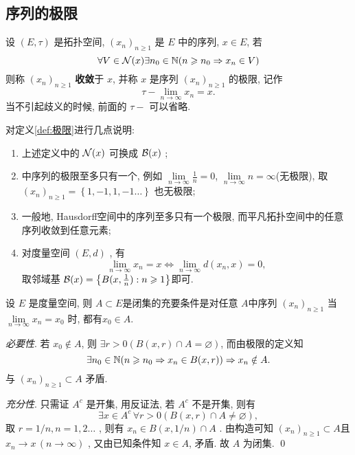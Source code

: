      \subsection{序列的极限}
     \begin{Definition}[极限]\label{def:极限}
          设 $ (E, \tau) $ 是拓扑空间, $ (x_{n})_{n\geqslant 1} $ 是 $ E $ 中的序列,  $ x\in E $, 若
          \[
               \forall V\in\mathcal{N}(x)\exists n_{0}\in\mathbb{N}(n\geqslant n_{0}\Rightarrow x_{n}\in V)
          \]
          则称 $ (x_{n})_{n\geqslant1} $ \textbf{收敛}于 $ x $, 并称 $ x $ 是序列 $ (x_{n})_{n\geqslant1} $ 的极限, 记作
          \[
               \tau-\lim_{n\to \infty}x_{n}=x. 
          \] 
          当不引起歧义的时候, 前面的 $ \tau- $ 可以省略. 
     \end{Definition}
     \begin{Remark}
          对定义\ref{def:极限}进行几点说明:
          \begin{enumerate}[(1)]
               \item 上述定义中的 $ \mathcal{N}(x) $ 可换成 $ \mathcal{B}(x) $ ;
               \item \R 中序列的极限至多只有一个, 例如 $\lim\limits_{n\to\infty}\frac{1}{n}=0 $, $ \lim\limits_{n\to\infty} n=\infty$(无极限), 取 $ (x_{n})_{n\geqslant1}=\left\{ 1, -1, 1,  -1\ldots \right\} $ 也无极限;
               \item\label{item:Hausdorff空间上极限唯一性} 一般地, Hausdorff空间中的序列至多只有一个极限, 而平凡拓扑空间中的任意序列收敛到任意元素;
               \item 对度量空间 $ (E, d) $ , 有
               \[
                    \lim_{n\to \infty}x_{n}=x \Leftrightarrow \lim_{n\to\infty}d(x_{n}, x)=0, 
               \]
               取邻域基 $ \mathcal{B}(x)=\left\{ B(x, \frac{1}{n}): n\geqslant1 \right\} $即可.  
          \end{enumerate}
     \end{Remark}
     \begin{Proposition}
          设 $ E $ 是度量空间, 则 $ A\subset E $是闭集的充要条件是对任意 $ A $中序列  $ (x_{n})_{n\geqslant1} $ 当 $ \lim\limits_{n\to\infty}x_{n}=x_{0} $ 时, 都有$ x_{0}\in A $.  
     \end{Proposition}
     \begin{Proof}
          \textsl{必要性}. 若 $ x_{0}\notin A $, 则 $ \exists r>0 (B(x, r)\cap A=\varnothing) $, 而由极限的定义知 
          \[
               \exists n_{0}\in\mathbb{N}(n\geqslant n_{0}\Rightarrow x_{n}\in B(x, r))\Rightarrow x_{n}\notin A. 
          \]
          与 $ (x_{n})_{n\geqslant1}\subset A $ 矛盾. 

          \textsl{充分性}. 只需证 $ A^{c} $ 是开集, 用反证法, 若 $ A^{c} $ 不是开集, 则有
          \[
               \exists x\in A^{c}\,\forall r>0(B(x, r)\cap A\neq\varnothing),
          \]
          取 $ r=1/n, n=1, 2\ldots $ , 则有 $ x_{n}\in B(x, 1/n)\cap A $ . 由构造可知 $ (x_{n})_{n\geqslant1}\subset A $且 $ x_{n}\to x\,(n\to\infty) $  , 又由已知条件知 $ x\in A $, 矛盾. 故 $ A $ 为闭集. \qed 
     \end{Proof}
